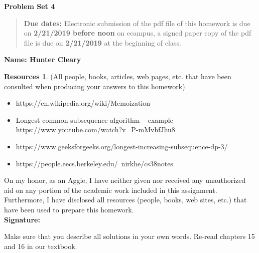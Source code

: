 \documentclass{article}
\theoremstyle{definition}
\newtheorem*{resources}{Resources}
\newcommand{\name}[1]{\noindent\textbf{Name: #1}}
\newcommand{\honor}{\noindent On my honor, as an Aggie, I have neither
  given nor received any unauthorized aid on any portion of the
  academic work included in this assignment. Furthermore, I have
  disclosed all resources (people, books, web sites, etc.) that have
  been used to prepare this homework. \\[1ex]
 \textbf{Signature:} \underline{\hspace*{5cm}} }
\newcommand{\problemset}[1]{\begin{center}\textbf{Problem Set
      #1}\end{center}}
\newcommand{\duedate}[2]{\begin{quote}\textbf{Due dates:} Electronic
    submission of the pdf file of this homework is due on
    \textbf{#1} on ecampus, a signed paper copy of the pdf file is due
    on \textbf{#2} at the beginning of class. \end{quote} }
\begin{document}
\problemset{4}
\duedate{2/21/2019 before noon}{2/21/2019}
\name{ Hunter Cleary }
\begin{resources} (All people, books, articles, web pages, etc. that
  have been consulted when producing your answers to this homework)
  \begin{itemize}
      \item https://en.wikipedia.org/wiki/Memoization
      \item Longest common subsequence algorithm -- example
      \\https://www.youtube.com/watch?v=P-mMvhfJhu8
      \item https://www.geeksforgeeks.org/longest-increasing-subsequence-dp-3/
      \item https://people.eecs.berkeley.edu/~nirkhe/cs38notes
  \end{itemize}
\end{resources}
\honor

\newpage
Make sure that you describe all solutions in your own words. Re-read
chapters 15 and 16 in our textbook. 
\end{document}
